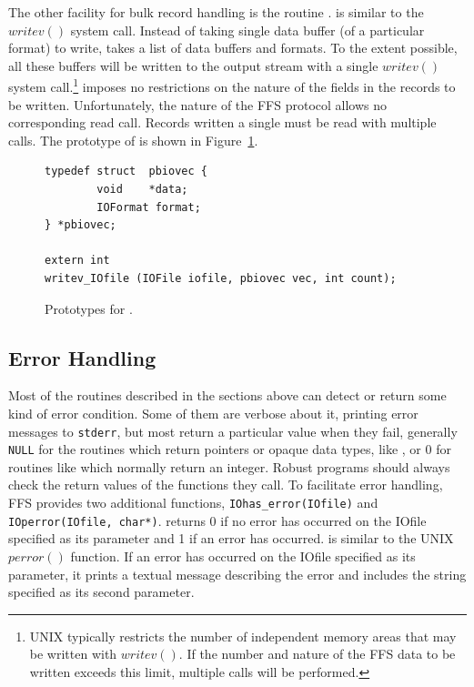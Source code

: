 The other facility for bulk record handling is the routine .
 is similar to the $writev()$ system call.  Instead of taking
single data buffer (of a particular format) to write,  takes
a list of data buffers and formats.  To the extent possible, all these buffers
will be written to the output stream with a single $writev()$ system
call.\footnote{UNIX typically restricts the number of independent memory areas
that may be written with $writev()$.  If the number and nature of the FFS
data to be written exceeds this limit, multiple calls will be performed.}
 imposes no restrictions on the nature of the fields in the
records to be written.  Unfortunately, the nature of the FFS protocol allows
no corresponding read call.  Records written a single  must
be read with multiple  calls.  The prototype of
 is shown in Figure~\ref{fig:writev}.
\begin{figure}[bth]
\begin{verbatim}
typedef struct  pbiovec {
        void    *data;
        IOFormat format;
} *pbiovec;

extern int
writev_IOfile (IOFile iofile, pbiovec vec, int count);
\end{verbatim}
\caption{Prototypes for .\label{fig:writev}}
\end{figure}

\subsection{Error Handling}
Most of the routines described in the sections above can detect or return some
kind of error condition.  Some of them are verbose about it, printing error
messages to {\tt stderr}, but most return a particular value when they fail,
generally {\tt NULL} for the routines which return pointers or opaque data
types, like , or $0$ for routines like
 which normally return an integer.  Robust programs should
always check the return values of the functions they call.  To facilitate
error handling, FFS provides two additional functions, {\tt IOhas\_error(IOfile)}
and {\tt IOperror(IOfile, char*)}.   returns 0 if no error has
occurred on the IOfile specified as its parameter and 1 if an error has
occurred.   is similar to the UNIX $perror()$ function.  If an
error has occurred on the IOfile specified as its parameter, it prints a
textual message describing the error and includes the string specified as its
second parameter.

